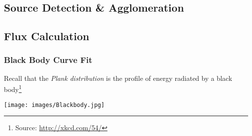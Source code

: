 \subsection{Source Detection \& Agglomeration}
\subsection{Flux Calculation}
\begin{frame}
\frametitle{Black Body Curve Fit}
Recall that the \emph{Plank distribution} is the profile of energy radiated by a black body\footnote{Source: \url{http://xkcd.com/54/}}
\begin{center}
\texttt{[image: images/Blackbody.jpg]}
\end{center}
\end{frame}
